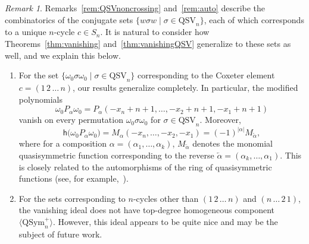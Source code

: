 \documentclass[12pt]{amsart}
\theoremstyle{definition}
\theoremstyle{remark}
\newtheorem{rem}[equation]{Remark}
\numberwithin{equation}{section}
\newcommand{\QSym}{\mathrm{QSym}}
\newcommand{\QSV}{\mathrm{QSV}}
\begin{document}
\begin{rem}
Remarks~\ref{rem:QSVnoncrossing} and~\ref{rem:auto} describe the combinatorics of the conjugate sets $\{w \sigma w \;|\; \sigma \in \QSV_{n}\}$, each of which corresponds to a unique $n$-cycle $c \in S_{n}$.  
It is natural to consider how Theorems~\ref{thm:vanishing} and~\ref{thm:vanishingQSV} generalize to these sets as well, and we explain this below.
\begin{enumerate}
\item For the set $\{\omega_{0} \sigma \omega_{0} \;|\; \sigma \in \QSV_{n}\}$ corresponding to the Coxeter element $c = (1\,2\,\ldots\,n)$, our results generalize completely.  In particular, the modified polynomials
	$$\omega_0P_\alpha\omega_0=P_\alpha(-x_n+n+1,\ldots, -x_2+n+1,-x_1+n+1)$$
vanish on every permutation $\omega_{0} \sigma \omega_{0}$ for $\sigma \in \QSV_{n}$. Moreover,
 \[
 \mathsf{h}\big(\omega_0P_\alpha\omega_0\big) = M_{\alpha}(-x_n,\ldots,-x_2,-x_1)=(-1)^{|\alpha|} M_{\overleftarrow{\alpha}},
 \]
where for a composition $\alpha=(\alpha_1,\ldots,\alpha_k)$,  $M_{\overleftarrow{\alpha}}$ denotes the monomial quasisymmetric function corresponding to the reverse $\overleftarrow{\alpha}=(\alpha_k,\ldots,\alpha_1)$.  This is closely related to the automorphisms of the ring of quasisymmetric functions (see, for example,~\cite{JWY}).

\item For the sets corresponding to $n$-cycles other than $(1\,2\,\ldots\,n)$ and $(n\,\ldots\,2\,1)$, the vanishing ideal does not have top-degree homogeneous component $\langle \QSym_{n}^{+} \rangle$.  
However, this ideal appears to be quite nice and may be the subject of future work.

\end{enumerate}
\end{rem}


\end{document}
